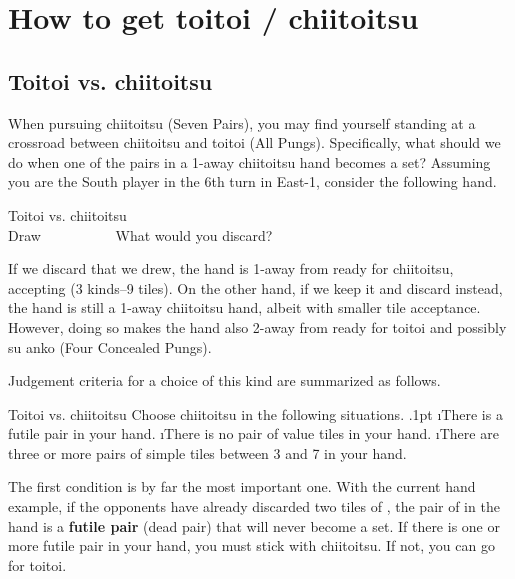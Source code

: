 \newpage
\section{How to get {\jap toitoi} / {\jap chiitoitsu}} \label{sec:toi}

\subsection{{\jap Toitoi} vs. {\jap chiitoitsu}}
When pursuing {\jap chiitoitsu} (Seven Pairs), you may find yourself standing at a crossroad between {\jap chiitoitsu} and {\jap toitoi} (All Pungs). Specifically, what should we do when one of the pairs in a 1-away {\jap chiitoitsu} hand becomes a set? Assuming you are the South player in the 6th turn in East-1, consider the following hand. 

\bigskip
\begin{itembox}[r]{{\jap Toitoi} vs. {\jap chiitoitsu}}
\bp
{}\fa\fa\bei~\\
\hfill\footnotesize{Draw~~~~~~~~~~}
\ep
\vspace{-17pt}What would you discard? \vspace{-5pt}
\end{itembox}

\bigskip
If we discard {\LARGE{}} that we drew, the hand is 1-away from ready for {\jap chiitoitsu}, accepting {\LARGE{}\bei} (3 kinds--9 tiles). On the other hand, if we keep it and discard {\LARGE{}} instead, the hand is still a 1-away {\jap chiitoitsu} hand, albeit with smaller tile acceptance. However, doing so makes the hand also 2-away from ready for {\jap toitoi} and possibly {\jap su anko} (Four Concealed Pungs). 

\bigskip
Judgement criteria for a choice of this kind are summarized as follows.
\bigskip
\begin{itembox}[c]{{\jap Toitoi} vs. {\jap chiitoitsu}}
Choose {\jap chiitoitsu} in the following situations.
\be\itemsep.1pt
\i There is a futile pair in your hand.
\i There is no pair of value tiles in your hand.
\i There are three or more pairs of simple tiles between 3 and 7 in your hand.
\ee
\end{itembox}

\bigskip
The first condition is by far the most important one. With the current hand example, if the opponents have already discarded two tiles of {\LARGE{}}, the pair of {\LARGE{}} in the hand is a {\bf futile pair} (dead pair) that will never become a set. If there is one or more futile pair in your hand, you must stick with {\jap chiitoitsu}. If not, you can go for {\jap toitoi}. 

